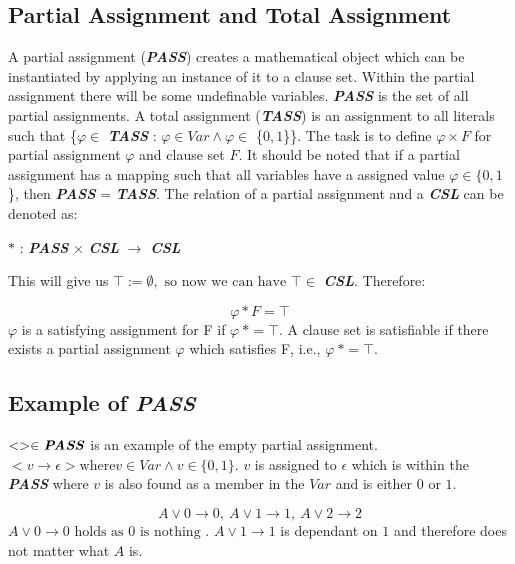 \documentclass[11pt,a4paper]{article}
\begin{document}
\subsection {Partial Assignment and Total Assignment}
\label{sec:pata}

A partial assignment (\textbf{\textit{PASS}}) creates a mathematical object which can be instantiated by applying an instance of it to a clause set. Within the partial assignment there will be some undefinable variables. \textbf{\textit{PASS}} is the set of all partial assignments. 
A total assignment (\textbf{\textit{TASS}}) is an assignment to all literals such that \{$\varphi \in$ \textbf{\textit{TASS}} : $\varphi \in Var \land \varphi \in$ \{$0,1$\}\}. The task is to define $\varphi \times F$ for partial assignment $\varphi$ and clause set $F$. It should be noted that if a partial assignment has a mapping such that all variables have a assigned value $\varphi \in \{0,1$\}, then \textbf{\textit{PASS}} = \textbf{\textit{TASS}}. 
The relation of a partial assignment and a \textbf{\textit{CSL}} can be denoted as: 

\begin{center}
$\ast$ : \textbf{\textit{PASS}} $\times$ \textbf{\textit{CSL}} $\rightarrow$ \textbf{\textit{CSL}}
\end{center}
This will give us $\top:= \emptyset, \text{ so now we can have } \top \in$ \textbf{\textit{CSL}}. Therefore:

\begin{displaymath}
\varphi \ast F = \top
\end{displaymath}
$\varphi$ is a satisfying assignment for F if $\varphi \: \ast = \top$. A clause set is satisfiable if there exists a partial assignment $\varphi$ which satisfies F, i.e., $\varphi \: \ast = \top$. 

\subsection{Example of \textbf{\textit{PASS}}}
$<> \in \textbf{\textit{PASS}}$ is an example of the empty partial assignment.
$< v \rightarrow \epsilon > \text{where} v \in Var \land v \in \{0,1\}$. $v$ is assigned to $\epsilon$ which is within the \textbf{\textit{PASS}} where $v$ is also found as a member in the $Var$ and is either $0$ or $1$. 

\begin{displaymath}
A \lor 0 \rightarrow 0, \: A \lor 1 \rightarrow 1, \: A \lor 2 \rightarrow 2
\end{displaymath}
$A \lor 0 \rightarrow 0 \text{ holds as } 0 \text { is nothing }$. $A \lor 1 \rightarrow 1$ is dependant on $1$ and therefore does not matter what $A$ is.
\end{document}
